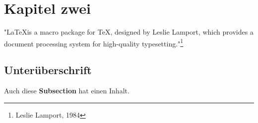 \section{Kapitel zwei}

"\LaTeX is a macro package for TeX, designed by Leslie Lamport, which provides a document processing system for high-quality typesetting."\footnote{Leslie Lamport, 1984}

\subsection{Unterüberschrift}

Auch diese \textbf{Subsection} hat einen Inhalt.